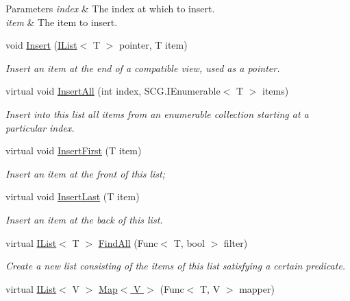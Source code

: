 \begin{DoxyCompactItemize}
\begin{DoxyCompactList}
\begin{DoxyParams}{Parameters}
{\em index} & The index at which to insert.\\
\hline
{\em item} & The item to insert.\\
\hline
\end{DoxyParams}
\end{DoxyCompactList}\item 
void \hyperlink{class_c5_1_1_array_list_a9622480e8a1e187bb4174cd1d149b1f9}{Insert} (\hyperlink{interface_c5_1_1_i_list}{I\+List}$<$ T $>$ pointer, T item)
\begin{DoxyCompactList}\small\item\em Insert an item at the end of a compatible view, used as a pointer. \end{DoxyCompactList}\item 
virtual void \hyperlink{class_c5_1_1_array_list_a587910564b15fa1c71b6ba72ff7a4395}{Insert\+All} (int index, S\+C\+G.\+I\+Enumerable$<$ T $>$ items)
\begin{DoxyCompactList}\small\item\em Insert into this list all items from an enumerable collection starting at a particular index. \end{DoxyCompactList}\item 
virtual void \hyperlink{class_c5_1_1_array_list_a272dc95d5ca8c2ce1b3ab43e3c56a4ce}{Insert\+First} (T item)
\begin{DoxyCompactList}\small\item\em Insert an item at the front of this list; \end{DoxyCompactList}\item 
virtual void \hyperlink{class_c5_1_1_array_list_a31ce1aee48da6e5e90791c61af922a3b}{Insert\+Last} (T item)
\begin{DoxyCompactList}\small\item\em Insert an item at the back of this list. \end{DoxyCompactList}\item 
virtual \hyperlink{interface_c5_1_1_i_list}{I\+List}$<$ T $>$ \hyperlink{class_c5_1_1_array_list_a8d970094faac5c6940db43796264b751}{Find\+All} (Func$<$ T, bool $>$ filter)
\begin{DoxyCompactList}\small\item\em Create a new list consisting of the items of this list satisfying a certain predicate. \end{DoxyCompactList}\item 
virtual \hyperlink{interface_c5_1_1_i_list}{I\+List}$<$ V $>$ \hyperlink{class_c5_1_1_array_list_a7a973a5950c1f27d95cce3d8d3a5979f}{Map$<$ V $>$} (Func$<$ T, V $>$ mapper)

\end{DoxyCompactItemize}
